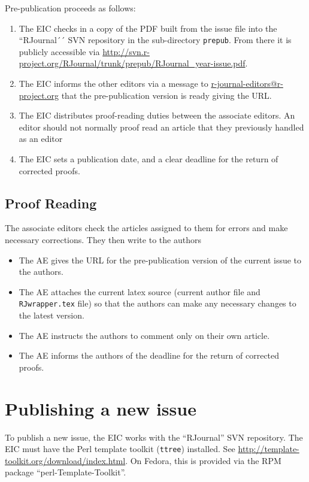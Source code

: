 \documentclass[11pt]{article}
\begin{document}
Pre-publication proceeds as follows:

\begin{enumerate}
\item The EIC checks in a copy of the PDF built from the issue file
  into the ``RJournal´´ SVN repository in the sub-directory
  \texttt{prepub}. From there it is publicly accessible via
  \url{http://svn.r-project.org/RJournal/trunk/prepub/RJournal_year-issue.pdf}.
\item The EIC informs the other editors via a message to
  \url{r-journal-editors@r-project.org} that the pre-publication
  version is ready giving the URL.
\item The EIC distributes proof-reading duties between the associate
  editors. An editor should not normally proof read an article that
  they previously handled as an editor
\item The EIC sets a publication date, and a clear deadline for the
  return of corrected proofs.
\end{enumerate}

\subsection{Proof Reading}

The associate editors check the articles assigned to them for errors
and make necessary corrections. They then write to the authors

\begin{itemize}
\item The AE gives the URL for the pre-publication version of the
  current issue to the authors.
\item The AE attaches the current latex source (current author file
  and \texttt{RJwrapper.tex} file) so that the authors can make any
  necessary changes to the latest version.
\item The AE instructs the authors to comment only on their own article.
\item The AE informs the authors of the deadline for the return of
  corrected proofs.
\end{itemize}

\section{Publishing a new issue}

To publish a new issue, the EIC works with the ``RJournal'' SVN
repository. The EIC must have the Perl template toolkit
(\texttt{ttree}) installed.  See
\url{http://template-toolkit.org/download/index.html}. On Fedora, this
is provided via the RPM package ``perl-Template-Toolkit''.
\end{document}
